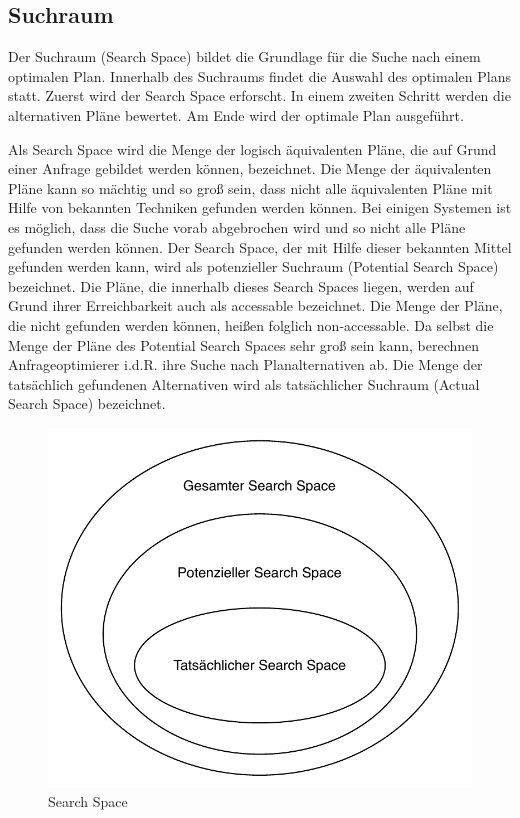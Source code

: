 \subsection{Suchraum}

Der Suchraum (Search Space) bildet die Grundlage für die Suche nach einem optimalen Plan. Innerhalb des Suchraums findet die Auswahl des optimalen Plans statt. 
Zuerst wird der Search Space erforscht. In einem zweiten Schritt werden die alternativen Pläne bewertet. Am Ende wird der optimale Plan ausgeführt.



Als Search Space wird die Menge der logisch äquivalenten Pläne, die auf Grund einer Anfrage gebildet werden können, bezeichnet. Die Menge der äquivalenten Pläne kann so mächtig und so groß sein, dass nicht alle äquivalenten Pläne mit Hilfe von bekannten Techniken gefunden werden können. Bei einigen Systemen ist es möglich, dass die Suche vorab abgebrochen wird und so nicht alle Pläne gefunden werden können. Der Search Space, der mit Hilfe dieser bekannten Mittel gefunden werden kann, wird als potenzieller Suchraum (Potential Search Space) bezeichnet. Die Pläne, die innerhalb dieses Search Spaces liegen, werden auf Grund ihrer Erreichbarkeit auch als accessable bezeichnet. Die Menge der Pläne, die nicht gefunden werden können, heißen folglich non-accessable. Da selbst die Menge der Pläne des Potential Search Spaces sehr groß sein kann, berechnen Anfrageoptimierer i.d.R. ihre Suche nach Planalternativen ab. Die Menge der tatsächlich gefundenen Alternativen wird als tatsächlicher Suchraum (Actual Search Space) bezeichnet.


\begin{figure}[ht]
  \centering
  \includegraphics[scale=0.75]{02_Related_Work/SearchSpace.pdf}
  \caption{Search Space}
  \label{SearchSpace}
\end{figure}


